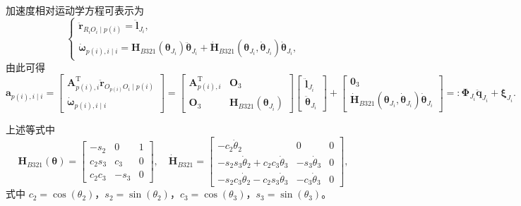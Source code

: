 加速度相对运动学方程可表示为
\begin{equation}\label{eq:10.14}
  \begin{cases}
    \ddot{\boldsymbol{r}}_{R_i O_i \mid p(i)} = \ddot{\boldsymbol{l}}_{J_i}, \\
    \dot{\boldsymbol{\omega}}_{p(i),i \mid i} = \boldsymbol{H}_{B321}(\boldsymbol{\theta}_{J_i}) \ddot{\boldsymbol{\theta}}_{J_i} + \dot{\boldsymbol{H}}_{B321}(\boldsymbol{\theta}_{J_i}, \dot{\boldsymbol{\theta}}_{J_i}) \dot{\boldsymbol{\theta}}_{J_i},
  \end{cases}
\end{equation}
由此可得
\begin{equation}\label{eq:10.15}
  \boldsymbol{a}_{p(i),i \mid i} = \begin{bmatrix} \boldsymbol{A}_{p(i),i}^{\mathrm{T}} \ddot{\boldsymbol{r}}_{O_{p(i)} O_i \mid p(i)} \\ \dot{\boldsymbol{\omega}}_{p(i),i \mid i} \end{bmatrix}
  = \begin{bmatrix} \boldsymbol{A}_{p(i),i}^{\mathrm{T}} & \boldsymbol{O}_3 \\ \boldsymbol{O}_3 & \boldsymbol{H}_{B321}(\boldsymbol{\theta}_{J_i}) \end{bmatrix}
  \begin{bmatrix} \ddot{\boldsymbol{l}}_{J_i} \\ \ddot{\boldsymbol{\theta}}_{J_i} \end{bmatrix}
  + \begin{bmatrix} \boldsymbol{0}_3 \\ \dot{\boldsymbol{H}}_{B321}(\boldsymbol{\theta}_{J_i}, \dot{\boldsymbol{\theta}}_{J_i}) \dot{\boldsymbol{\theta}}_{J_i} \end{bmatrix}
  =: \boldsymbol{\Phi}_{J_i} \ddot{\boldsymbol{q}}_{J_i} + \boldsymbol{\xi}_{J_i}.
\end{equation}

上述等式中
\begin{equation}\label{eq:10.15b}
  \boldsymbol{H}_{B321}(\boldsymbol{\theta}) = \begin{bmatrix}
    -s_2 & 0 & 1 \\
    c_2 s_3 & c_3 & 0 \\
    c_2 c_3 & -s_3 & 0
  \end{bmatrix}, \quad
  \dot{\boldsymbol{H}}_{B321} = \begin{bmatrix}
    -c_2 \dot{\theta}_2 & 0 & 0 \\
    -s_2 s_3 \dot{\theta}_2 + c_2 c_3 \dot{\theta}_3 & -s_3 \dot{\theta}_3 & 0 \\
    -s_2 c_3 \dot{\theta}_2 - c_2 s_3 \dot{\theta}_3 & -c_3 \dot{\theta}_3 & 0
  \end{bmatrix},
\end{equation}
式中 $c_2 = \cos(\theta_2)$，$s_2 = \sin(\theta_2)$，$c_3 = \cos(\theta_3)$，$s_3 = \sin(\theta_3)$。

